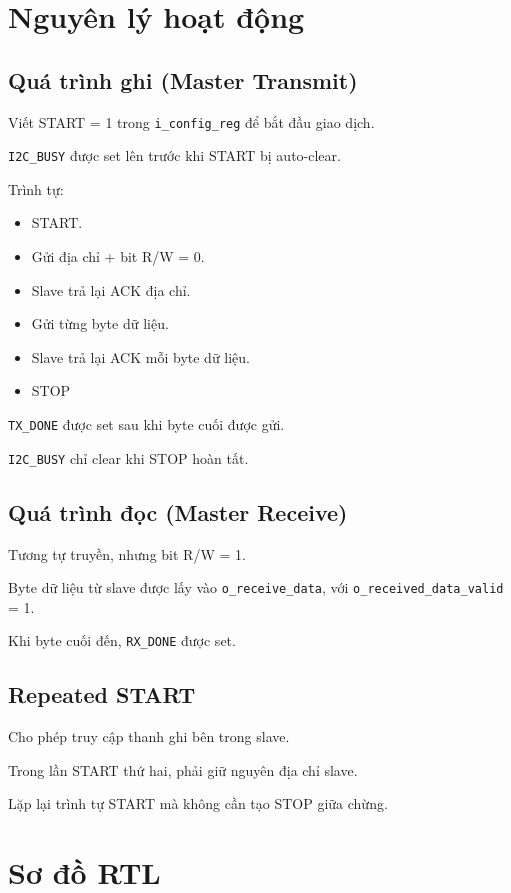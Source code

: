 \section{Nguyên lý hoạt động}

\subsection{Quá trình ghi (Master Transmit)}
Viết START = 1 trong \texttt{i\_config\_reg} để bắt đầu giao dịch.

\texttt{I2C\_BUSY} được set lên trước khi START bị auto-clear.

Trình tự:
\begin{itemize}[leftmargin=1.2cm]
    \item START.
    \item Gửi địa chỉ + bit R/W = 0.
    \item Slave trả lại ACK địa chỉ.
    \item Gửi từng byte dữ liệu.
    \item Slave trả lại ACK mỗi byte dữ liệu.
    \item STOP
\end{itemize}

\texttt{TX\_DONE} được set sau khi byte cuối được gửi.

\texttt{I2C\_BUSY} chỉ clear khi STOP hoàn tất.

\subsection{Quá trình đọc (Master Receive)}
Tương tự truyền, nhưng bit R/W = 1.

Byte dữ liệu từ slave được lấy vào \texttt{o\_receive\_data}, với \texttt{o\_received\_data\_valid} = 1.

Khi byte cuối đến, \texttt{RX\_DONE} được set.

\subsection{Repeated START}
Cho phép truy cập thanh ghi bên trong slave.

Trong lần START thứ hai, phải giữ nguyên địa chỉ slave.

Lặp lại trình tự START mà không cần tạo STOP giữa chừng.

\section{Sơ đồ RTL}

